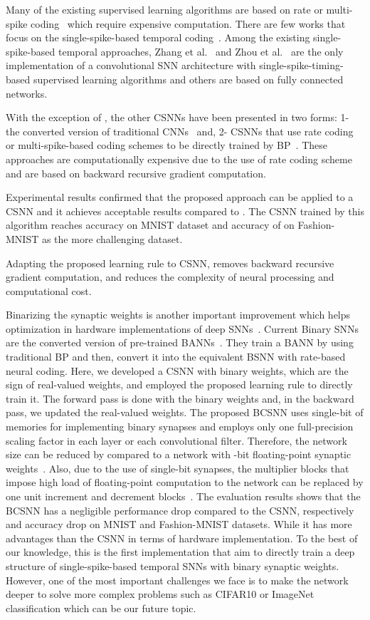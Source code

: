 \documentclass[preprint,twocolumn,5p,12pt]{article}
\begin{document}
Many of the existing supervised learning algorithms are based on rate or multi-spike coding~\cite{B6,B7,B9,B10,B11,B12,B13} which require expensive computation.
There are few works that focus on the single-spike-based temporal coding~\cite{R3,R7,R8,R9,R10,R17,R18,S1}.
Among the existing single-spike-based temporal approaches, Zhang et al.~\cite{R18} and Zhou et al.~\cite{S1} are the only implementation of a convolutional SNN architecture with single-spike-timing-based supervised learning algorithms and others are based on fully connected networks.

With the exception of \cite{R18,S1}, the other CSNNs have been presented in two forms:
1- the converted version of traditional CNNs~\cite{R4,R5,R6,R46} and,
2- CSNNs that use rate coding or multi-spike-based coding schemes to be directly trained by BP~\cite{R11,R12,R13}.
These approaches are computationally expensive due to the use of rate coding scheme and are based on backward recursive gradient computation.

Experimental results confirmed that the proposed approach can be applied to a CSNN and it achieves acceptable results compared to \cite{R18}.
The CSNN trained by this algorithm reaches  accuracy on MNIST dataset and accuracy of  on Fashion-MNIST as the more challenging dataset.

Adapting the proposed learning rule to CSNN, removes backward recursive gradient computation, and reduces the complexity of neural processing and computational cost.

Binarizing the synaptic weights is another important improvement which helps optimization in hardware implementations of deep SNNs~\cite{A13, A43}.
Current Binary SNNs are the converted version of pre-trained BANNs~\cite{R14,R15,R16,R19}.
They train a BANN by using traditional BP and then, convert it into the equivalent BSNN with rate-based neural coding. 
Here, we developed a CSNN with binary weights, which are the sign of real-valued weights, and employed the proposed learning rule to directly train it. 
The forward pass is done with the binary weights and, in the backward pass, we updated the real-valued weights.
The proposed BCSNN uses single-bit of memories for implementing binary synapses and employs only one full-precision scaling factor in each layer or each convolutional filter. Therefore, the network size can be reduced by  compared to a network with -bit floating-point synaptic weights~\cite{R18}.
Also, due to the use of single-bit synapses, the multiplier blocks that impose high load of floating-point computation to the network can be replaced by one unit increment and decrement blocks~\cite{R18}.
The evaluation results shows that the BCSNN has a negligible performance drop compared to the CSNN, respectively  and  accuracy drop on MNIST and Fashion-MNIST datasets. While it has more advantages than the CSNN in terms of hardware implementation.
To the best of our knowledge, this is the first implementation that aim to directly train a deep structure of single-spike-based temporal SNNs with binary synaptic weights.
However, one of the most important challenges we face is to make the network deeper to solve more complex problems such as CIFAR10 or ImageNet classification which can be our future topic.
\end{document}
